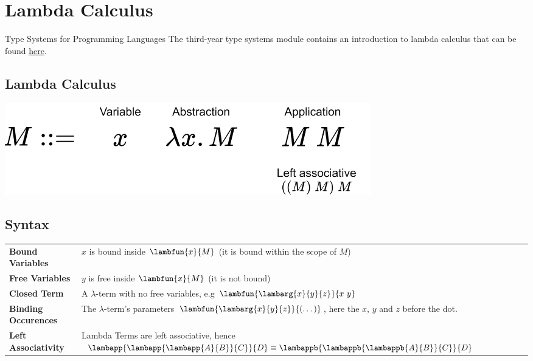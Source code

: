 \chapter{Lambda Calculus}

\begin{sidenotebox}{Type Systems for Programming Languages}
    The third-year type systems module contains an introduction to lambda calculus that can be found \href{https://oliverkillane.github.io/Imperial-Computing-Notes/60023%20-%20Type%20Systems%20for%20Programming%20Languages/60023%20-%20Type%20Systems%20for%20Programming%20Languages.pdf}{here}. 
\end{sidenotebox}

\section{Lambda Calculus}
\begin{center}
    \includegraphics[width=0.7\textwidth]{lambda_calculus/images/lambda_form.drawio.png}
\end{center}

\section{Syntax}
\begin{center}
    \begin{tabular}{l p{}}
        \textbf{Bound Variables} & $x$ is bound inside $\lambfun{x}{M}$ (it is bound within the scope of $M$) \\
        \textbf{Free Variables} & $y$ is free inside $\lambfun{x}{M}$ (it is not bound) \\
        \textbf{Closed Term} & A $\lambda$-term with no free variables, e.g $\lambfun{\lambarg{x}{y}{z}}{x \ y}$ \\
        \textbf{Binding Occurences} & The $\lambda$-term's parameters $\lambfun{\lambarg{x}{y}{z}}{(\dots)}$, here the $x$, $y$ and $z$ before the dot. \\
        \textbf{Left Associativity} & Lambda Terms are left associative, hence $\lambapp{\lambapp{\lambapp{A}{B}}{C}}{D} \equiv \lambappb{\lambappb{\lambappb{A}{B}}{C}}{D}$ \\
    \end{tabular}
\end{center}

